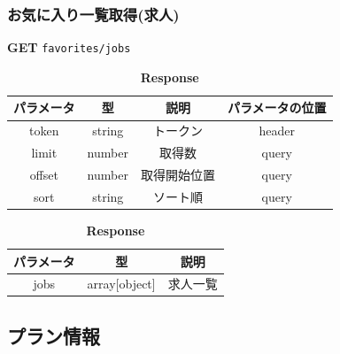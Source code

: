 \subsubsection*{お気に入り一覧取得(求人)}
\textbf{GET} \texttt{favorites/jobs}
\begin{table}[H]
  \begin{minipage}
    {0.5\hsize}
    \centering
    \captionsetup{labelformat=empty,labelsep=none} \caption{\textbf{Request}}
    \small
    \begin{tabular}{|c|c|c|c|} \hline
      パラメータ  & 型      & 説明     & パラメータの位置 \\ \hline \hline
      token  & string & トークン   & header   \\ \hline
      limit  & number & 取得数    & query    \\ \hline
      offset & number & 取得開始位置 & query    \\ \hline
      sort   & string & ソート順   & query    \\ \hline
    \end{tabular}
  \end{minipage}
  \begin{minipage}
    {0.5\hsize}
    \centering
    \captionsetup{labelformat=empty,labelsep=none} \caption{\textbf{Response}}
    \begin{tabular}{|c|c|c|} \hline
      パラメータ & 型             & 説明   \\ \hline \hline
      jobs  & array[object] & 求人一覧 \\ \hline
    \end{tabular}
  \end{minipage}
\end{table}
\hrulefill
\subsection{プラン情報}
